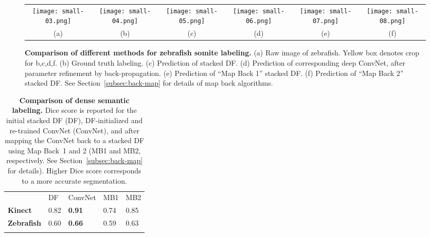 \documentclass[twocolumn]{svjour3}
\begin{document}
\begin{figure*}
\begin{center}
\begin{tabular}{cccccc}

   \texttt{[image: small-03.png]} &
   \texttt{[image: small-04.png]} &
   \texttt{[image: small-05.png]} &
	 \texttt{[image: small-06.png]} &
	 \texttt{[image: small-07.png]} &
	 \texttt{[image: small-08.png]} \\
	 			  (a) & (b) & (c) & (d) & (e) & (f)
\end{tabular}
\end{center}
   \caption{\textbf{Comparison of different methods for zebrafish somite labeling.} (a) Raw image of zebrafish.  Yellow box denotes crop for b,c,d,f. (b) Ground truth labeling. (c) Prediction of stacked DF. (d) Prediction of corresponding deep ConvNet, after parameter refinement by back-propagation. (e) Prediction of ``Map Back 1'' stacked DF. (f) Prediction of ``Map Back 2'' stacked DF. See Section~\ref{subsec:back-map} for details of map back algorithms.}
\label{fig:comparison}
\end{figure*}

\begin{table}
  	\caption{\textbf{Comparison of dense semantic labeling. } Dice score is reported for the initial stacked DF (DF), DF-initialized and re-trained ConvNet (ConvNet), and after mapping the ConvNet back to a stacked DF using Map Back~1 and 2 (MB1 and MB2, respectively. See Section~\ref{subsec:back-map} for details). Higher Dice score corresponds to a more accurate segmentation.}
	\label{tab:dice-score}
	\begin{center}
		\begin{tabular}{lllll}
			\hline\noalign{\smallskip}
			& DF & ConvNet & MB1 & MB2  \\
			\noalign{\smallskip}\hline\noalign{\smallskip}
			\textbf{Kinect} & 0.82 & \textbf{0.91} & 0.74 & 0.85 \\
			\textbf{Zebrafish} & 0.60 & \textbf{0.66} & 0.59 & 0.63 \\
			\noalign{\smallskip}\hline
   		\end{tabular}
	\end{center}
\end{table}
\end{document}
